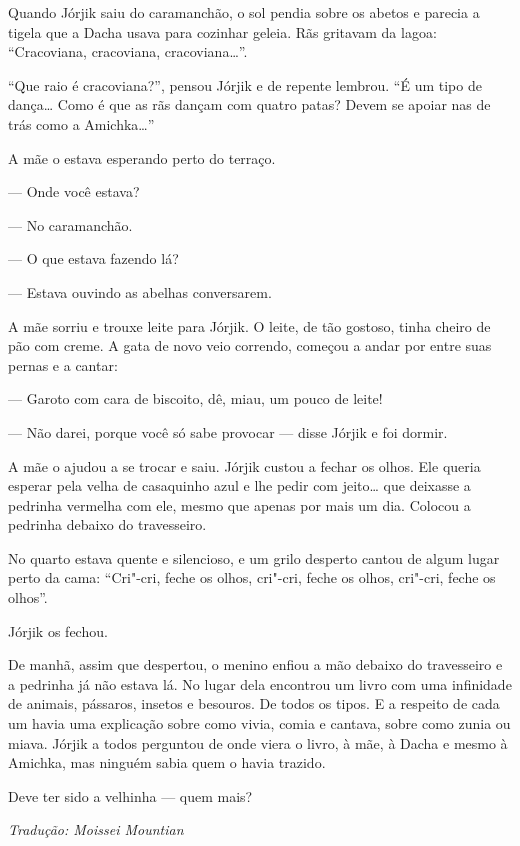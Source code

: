 Quando Jórjik saiu do caramanchão, o sol pendia sobre os abetos e
parecia a tigela que a Dacha usava para cozinhar geleia. Rãs gritavam da
lagoa: ``Cracoviana, cracoviana, cracoviana\ldots{}''.

``Que raio é cracoviana?'', pensou Jórjik e de repente lembrou. ``É um tipo de dança\ldots{} Como é que as rãs dançam com quatro patas? Devem se
apoiar nas de trás como a Amichka\ldots{}''

A mãe o estava esperando perto do terraço.

--- Onde você estava?

--- No caramanchão.

--- O que estava fazendo lá?

--- Estava ouvindo as abelhas conversarem.

A mãe sorriu e trouxe leite para Jórjik. O leite, de tão gostoso, tinha
cheiro de pão com creme. A gata de novo veio correndo, começou a andar
por entre suas pernas e a cantar:

--- Garoto com cara de biscoito, dê, miau, um pouco de leite!

--- Não darei, porque você só sabe provocar --- disse Jórjik e foi
dormir.

A mãe o ajudou a se trocar e saiu. Jórjik custou a fechar os olhos. Ele
queria esperar pela velha de casaquinho azul e lhe pedir com jeito\ldots{}
que deixasse a pedrinha vermelha com ele, mesmo que apenas por mais um
dia. Colocou a pedrinha debaixo do travesseiro.

No quarto estava quente e silencioso, e um grilo desperto cantou de
algum lugar perto da cama: ``Cri"-cri, feche os olhos, cri"-cri, feche os
olhos, cri"-cri, feche os olhos''.

Jórjik os fechou.

De manhã, assim que despertou, o menino enfiou a mão debaixo do
travesseiro e a pedrinha já não estava lá. No lugar dela encontrou um
livro com uma infinidade de animais, pássaros, insetos e besouros. De
todos os tipos. E a respeito de cada um havia uma explicação sobre como
vivia, comia e cantava, sobre como zunia ou miava. Jórjik a todos
perguntou de onde viera o livro, à mãe, à Dacha e mesmo à Amichka, mas
ninguém sabia quem o havia trazido.

Deve ter sido a velhinha --- quem mais? \enlargethispage{\baselineskip}


{\footnotesize\hfill\emph{Tradução: Moissei Mountian}}

